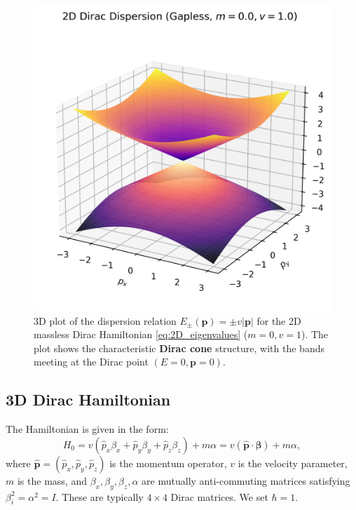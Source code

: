 \documentclass[11pt]{article}
\begin{document}
\begin{figure}[htbp]
\begin{minipage}[t]{0.48\textwidth}
    \includegraphics[width=\textwidth]{2d_dirac_dispersion_gapless.png}
    \caption{3D plot of the dispersion relation $E_{\pm}(\mathbf{p}) = \pm v |\mathbf{p}|$ for the 2D massless Dirac Hamiltonian \eqref{eq:2D_eigenvalues} ($m=0, v=1$). The plot shows the characteristic \textbf{Dirac cone} structure, with the bands meeting at the Dirac point $(E=0, \mathbf{p}=0)$.}
    \label{fig:2D_dispersion_gapless}
  \end{minipage}
\end{figure}



\subsection{3D Dirac Hamiltonian}

The Hamiltonian is given in the form:
\begin{equation}
H_0 = v(\hat{p}_x \beta_x + \hat{p}_y \beta_y + \hat{p}_z \beta_z) + m \alpha = v (\hat{\mathbf{p}} \cdot \bm{\beta}) + m \alpha,
\end{equation}
where $\hat{\mathbf{p}} = (\hat{p}_x, \hat{p}_y, \hat{p}_z)$ is the momentum operator, $v$ is the velocity parameter, $m$ is the mass, and $\beta_x, \beta_y, \beta_z, \alpha$ are mutually anti-commuting matrices satisfying $\beta_i^2 = \alpha^2 = I$. These are typically $4 \times 4$ Dirac matrices. We set $\hbar=1$.
\end{document}
